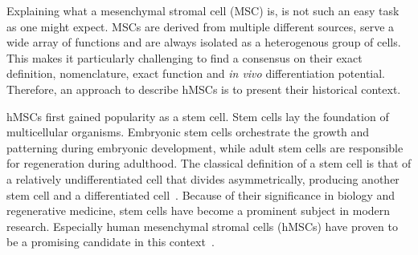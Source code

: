 



%
\label{sec:intro_hMSCs}%
Explaining what a mesenchymal stromal cell (MSC) is, is not such an easy task as
one might expect. MSCs are derived from multiple different sources, serve a wide
array of functions and are always isolated as a heterogenous group of cells.
This makes it particularly challenging to find a consensus on their exact
definition, nomenclature, exact function and \textit{in vivo} differentiation
potential. Therefore, an approach to describe hMSCs is to present their
historical context.

hMSCs first gained popularity as a stem cell. Stem cells lay the foundation of
multicellular organisms. Embryonic stem cells orchestrate the growth and
patterning during embryonic development, while adult stem cells are responsible
for regeneration during adulthood. The classical definition of a stem cell is
that of a relatively undifferentiated cell that divides asymmetrically,
producing another stem cell and a differentiated
cell~\cite{cooperCellMolecularApproach2000, shenghuiMechanismsStemCell2009}.
Because of their significance in biology and regenerative medicine, stem cells
have become a prominent subject in modern research. Especially human mesenchymal
stromal cells (hMSCs) have proven to be a promising candidate in this
context~\cite{ullahHumanMesenchymalStem2015}.

